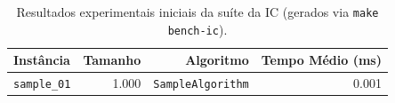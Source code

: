 \begin{table}[!ht]
\centering
\small
\begin{tabular}{lrrr}
\toprule
\textbf{Instância} & \textbf{Tamanho} & \textbf{Algoritmo} & \textbf{Tempo Médio (ms)} \\
\midrule
\texttt{sample\_01} & 1.000 & \texttt{SampleAlgorithm} & 0.001 \\
\bottomrule
\end{tabular}
\caption{Resultados experimentais iniciais da suíte da IC (gerados via \texttt{make bench-ic}).}
\label{tab:results_ic}
\end{table}
